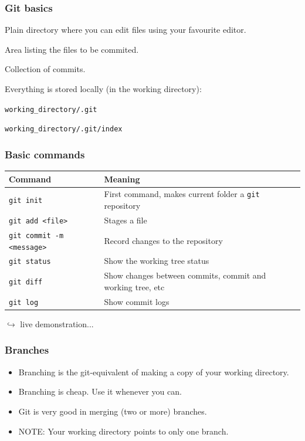 \documentclass{beamer}
\begin{document}
\begin{frame}[fragile]
\frametitle{Git basics}
\begin{description}
 \item[working directory]
  Plain directory where you can edit files using your favourite editor.
 \item[staging area]
  Area listing the files to be commited.
 \item[repository]
  Collection of commits.
\end{description}

Everything is stored locally (in the working directory):
\begin{description}
 \item[repository] \verb|working_directory/.git|
 \item[staging area] \verb|working_directory/.git/index|
\end{description}
\end{frame}

\begin{frame}
\frametitle{Basic commands}
\begin{table}
\begin{tabularx}{\textwidth}{l|X}
Command & Meaning \\
 \hline
 \texttt{git init} & First command, makes current folder a \texttt{git} repository\\
 \texttt{git add <file>} & Stages a file\\
 \texttt{git commit -m <message>} & Record changes to the repository\\
 \texttt{git status} & Show the working tree status\\
 \texttt{git diff} & Show changes between commits, commit and working tree, etc\\
 \texttt{git log} & Show commit logs\\
\end{tabularx}
\end{table}
\hfill $\hookrightarrow$ live demonstration...
\end{frame}

\begin{frame}
\frametitle{Branches}
\begin{itemize}
 \item Branching is the git-equivalent of making a copy of your working
 directory.
 \item Branching is cheap.  Use it whenever you can.
 \item Git is very good in merging (two or more) branches.
 \item NOTE: Your working directory points to only one branch.
\end{itemize}
\end{frame}
\end{document}
